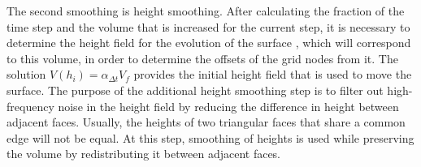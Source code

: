 \documentclass[
11pt,%
tightenlines,%
twoside,%
onecolumn,%
nofloats,%
nobibnotes,%
nofootinbib,%
superscriptaddress,%
noshowpacs,%
centertags]%
{revtex4}
\begin{document}
The second smoothing is height smoothing.
After calculating the fraction of the time step and the volume that is increased for the current step, it is necessary to determine the height field for the evolution of the surface , which will correspond to this volume, in order to determine the offsets of the grid nodes from it.
The solution $V(h_i) = \alpha_{\Delta t} V_f$ provides the initial height field that is used to move the surface.
The purpose of the additional height smoothing step is to filter out high-frequency noise in the height field by reducing the difference in height between adjacent faces.
Usually, the heights of two triangular faces that share a common edge will not be equal.
At this step, smoothing of heights is used while preserving the volume by redistributing it between adjacent faces.
\end{document}
